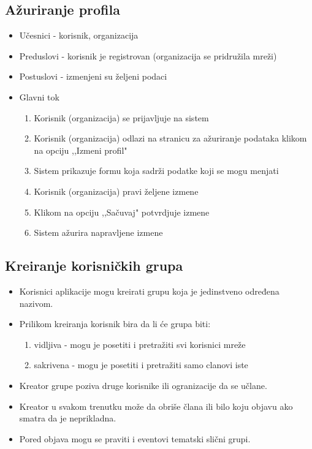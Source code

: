 \subsection{Ažuriranje profila}
\begin{itemize}
\item Učesnici - korisnik, organizacija
\item Preduslovi - korisnik je registrovan (organizacija se pridružila mreži)
\item Postuslovi - izmenjeni su željeni podaci
\item Glavni tok
\begin{enumerate}
\item Korisnik (organizacija) se prijavljuje na sistem
\item Korisnik (organizacija) odlazi na stranicu za ažuriranje podataka klikom na opciju ,,Izmeni profil"
\item Sistem prikazuje formu koja sadrži podatke koji se mogu menjati
\item Korisnik (organizacija) pravi željene izmene
\item Klikom na opciju ,,Sačuvaj" potvrdjuje izmene
\item Sistem ažurira napravljene izmene
\end{enumerate}
\end{itemize}

\subsection{Kreiranje korisničkih grupa}
\begin{itemize}
\item Korisnici aplikacije mogu kreirati grupu koja je jedinstveno određena nazivom. 
\item Prilikom kreiranja korisnik bira da li će grupa biti:

\begin{enumerate}
\item vidljiva - mogu je posetiti i pretražiti svi korisnici mreže
\item sakrivena - mogu je posetiti i pretražiti samo clanovi iste
\end{enumerate}

\item	Kreator grupe poziva druge korisnike ili ogranizacije da se učlane.
\item	Kreator u svakom trenutku može da obriše člana ili bilo koju objavu ako smatra da je neprikladna.
\item	Pored objava mogu se praviti i eventovi tematski slični grupi.
\end{itemize}

